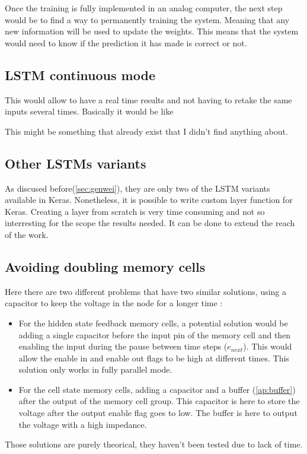 Once the training is fully implemented in an analog computer, the next step would be to find a way to permanently training the system. Meaning that any new information will be used to update the weights. This means that the system would need to know if the prediction it has made is correct or not.

\subsection{\ac{LSTM} continuous mode}

This would allow to have a real time results and not having to retake the same inputs several times. Basically it would be like %

This might be something that already exist that I didn't find anything about.

\subsection{Other \acp{LSTM} variants}

As discused before(\cref{sec:genwei}), they are only two of the \ac{LSTM} variants available in Keras. Nonetheless, it is possible to write custom layer function for Keras. Creating a layer from scratch is very time consuming and not so interresting for the scope the results needed. It can be done to extend the reach of the work.

\subsection{Avoiding doubling memory cells}\label{subsec:noDoubleMemcell}

Here there are two different problems that have two similar solutions, using a capacitor to keep the voltage in the node for a longer time :
\begin{itemize}
  \item For the hidden state feedback memory cells, a potential solution would be adding a single capacitor before the input pin of the memory cell and then enabling the input during the pause between time steps ($e_{next}$). This would allow the enable in and enable out flags to be high at different times. This solution only works in fully parallel mode.
  \item For the cell state memory cells, adding a capacitor and a buffer (\cref{ap:buffer}) after the output of the memory cell group. This capacitor is here to store the voltage after the output enable flag goes to low. The buffer is here to output the voltage with a high impedance.
\end{itemize}

Those solutions are purely theorical, they haven't been tested due to lack of time.
